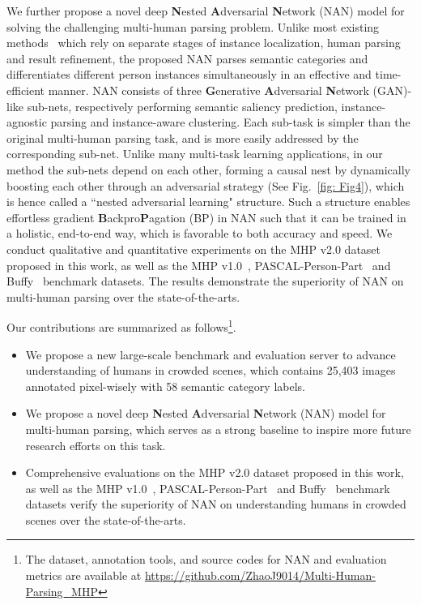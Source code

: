 \documentclass[10pt,twocolumn,letterpaper]{article}
\theoremstyle{definition}
\theoremstyle{remark}
\begin{document}
We further propose a novel deep \textbf{N}ested \textbf{A}dversarial \textbf{N}etwork (NAN) model for solving the challenging multi-human parsing problem. Unlike most existing methods~\cite{li2017towards, jiang2016detangling, li2017holistic} which rely on separate stages of instance localization, human parsing and result refinement, the proposed NAN parses semantic categories and differentiates different person instances simultaneously in an effective and time-efficient manner. NAN consists of three \textbf{G}enerative \textbf{A}dversarial \textbf{N}etwork (GAN)-like sub-nets, respectively performing semantic saliency prediction, instance-agnostic parsing and instance-aware clustering. Each sub-task is simpler than the original multi-human parsing task, and is more easily addressed by the corresponding sub-net. Unlike many multi-task learning applications, in our method the sub-nets depend on each other, forming a causal nest by dynamically boosting each other through an adversarial strategy (See Fig.~\ref{fig: Fig4}), which is hence called a ``nested adversarial learning" structure. Such a structure enables effortless gradient \textbf{B}ackpro\textbf{P}agation (BP) in NAN such that it can be trained in a holistic, end-to-end way, which is favorable to both accuracy and speed. We conduct qualitative and quantitative experiments on the MHP v2.0 dataset proposed in this work, as well as the MHP v1.0~\cite{li2017towards}, PASCAL-Person-Part~\cite{chen2014detect} and Buffy~\cite{vineet2011human} benchmark datasets. The results demonstrate the superiority of NAN on multi-human parsing over the state-of-the-arts.

Our contributions are summarized as follows\footnote{The dataset, annotation tools, and source codes for NAN and evaluation metrics are available at \url{https://github.com/ZhaoJ9014/Multi-Human-Parsing_MHP}}.
\begin{itemize}
	\setlength\itemsep{0em}
	\item We propose a new large-scale benchmark and evaluation server to advance understanding of humans in crowded scenes, which contains 25{,}403 images annotated pixel-wisely with 58 semantic category labels.
	\item We propose a novel deep \textbf{N}ested \textbf{A}dversarial \textbf{N}etwork (NAN) model for multi-human parsing, which serves as a strong baseline to inspire more future research efforts on this task.
	\item Comprehensive evaluations on the MHP v2.0 dataset proposed in this work, as well as the MHP v1.0~\cite{li2017towards}, PASCAL-Person-Part~\cite{chen2014detect} and Buffy~\cite{vineet2011human} benchmark datasets verify the superiority of NAN on understanding humans in crowded scenes over the state-of-the-arts.
\end{itemize}
\end{document}
